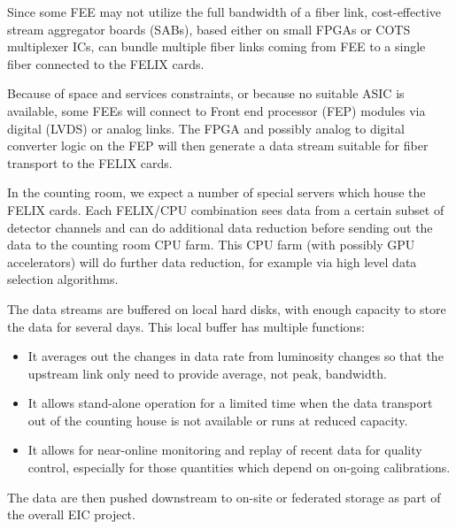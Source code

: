 Since some FEE may not utilize the full bandwidth of a fiber link, cost-effective stream aggregator boards (SABs), based either on small FPGAs or COTS multiplexer ICs, can bundle multiple fiber links coming from FEE to a single fiber connected to the FELIX cards. 

Because of space and services constraints, or because no suitable ASIC is available, some FEEs will connect to Front end processor (FEP) modules via digital (LVDS) or analog links. The FPGA and possibly analog to digital converter logic on the FEP will then generate a data stream suitable for fiber transport to the FELIX cards.

In the counting room, we expect a number of special servers which house the FELIX cards. Each FELIX/CPU combination sees data from a certain subset of detector channels and can do additional data reduction before sending out the data to the counting room CPU farm. This CPU farm (with possibly GPU accelerators) will do further data reduction, for example via high level data selection algorithms.

The data streams are buffered on local hard disks, with enough capacity to store the data for several days. This local buffer has multiple functions: 
\begin{itemize}
    \item It averages out the changes in data rate from luminosity changes so that the upstream link only need to provide average, not peak, bandwidth.
    \item It allows stand-alone operation for a limited time when the data transport out of the counting house is not available or runs at reduced capacity.
    \item It allows for near-online monitoring and replay of recent data for quality control, especially for those quantities which depend on on-going calibrations.        
\end{itemize}

The data are then pushed downstream to on-site or federated storage as part of the overall EIC project.

